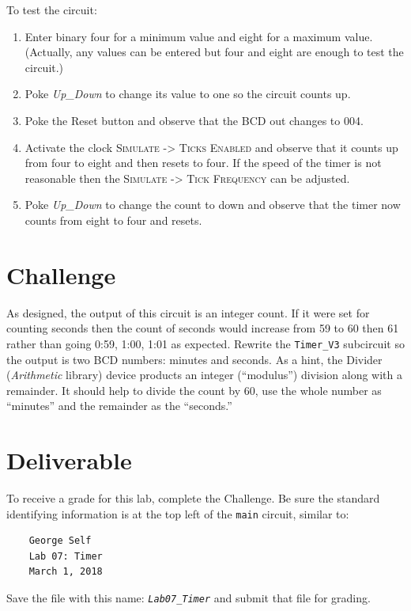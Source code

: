 To test the circuit:

\begin{enumerate}
	\item Enter binary four for a minimum value and eight for a maximum value. (Actually, any values can be entered but four and eight are enough to test the circuit.) 
	\item Poke \textit{Up\_Down} to change its value to one so the circuit counts up.
	\item Poke the Reset button and observe that the BCD out changes to 004.
	\item Activate the clock \textsc{Simulate -> Ticks Enabled} and observe that it counts up from four to eight and then resets to four. If the speed of the timer is not reasonable then the \textsc{Simulate -> Tick Frequency} can be adjusted.
	\item Poke \textit{Up\_Down} to change the count to down and observe that the timer now counts from eight to four and resets.
\end{enumerate}

\section{Challenge}

As designed, the output of this circuit is an integer count. If it were set for counting seconds then the count of seconds would increase from 59 to 60 then 61 rather than going 0:59, 1:00, 1:01 as expected. Rewrite the \lstinline[columns=fixed]|Timer_V3| subcircuit so the output is two BCD numbers: minutes and seconds. As a hint, the Divider (\textit{Arithmetic} library) device products an integer (``modulus'') division along with a remainder. It should help to divide the count by 60, use the whole number as ``minutes'' and the remainder as the ``seconds.''

\section{Deliverable}

To receive a grade for this lab, complete the Challenge. Be sure the standard identifying information is at the top left of the \lstinline{main} circuit, similar to: 

\bigskip
\begin{minipage}{\linewidth}
	\begin{verbatim}
	George Self
	Lab 07: Timer
	March 1, 2018
	\end{verbatim}
\end{minipage}
\bigskip

Save the file with this name: \emph{\texttt{Lab07\_Timer}} and submit that file for grading.

